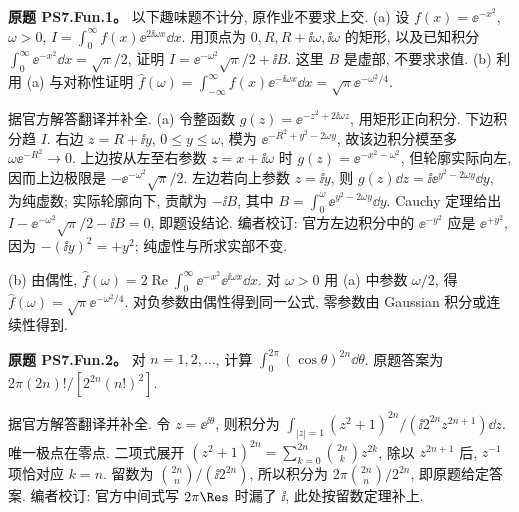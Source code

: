 \begin{exercise}
\textbf{原题 PS7.Fun.1。}\label{ass:ps7-fun1}
以下趣味题不计分, 原作业不要求上交.
(a) 设 $f(x)=\ee^{-x^2}$, $\omega>0$, $I=\int_0^\infty f(x)\ee^{2\ii\omega x}\dd x$. 用顶点为 $0,R,R+\ii\omega,\ii\omega$ 的矩形, 以及已知积分 $\int_0^\infty\ee^{-x^2}\dd x=\sqrt\pi/2$, 证明 $I=\ee^{-\omega^2}\sqrt\pi/2+\ii B$. 这里 $B$ 是虚部, 不要求求值.
(b) 利用 (a) 与对称性证明 $\widehat f(\omega)=\int_{-\infty}^{\infty}f(x)\ee^{-\ii\omega x}\dd x=\sqrt\pi\ee^{-\omega^2/4}$.
\end{exercise}
\begin{solution}
据官方解答翻译并补全.
(a) 令整函数 $g(z)=\ee^{-z^2+2\ii\omega z}$, 用矩形正向积分. 下边积分趋 $I$.
右边 $z=R+\ii y$, $0\le y\le\omega$, 模为 $\ee^{-R^2+y^2-2\omega y}$, 故该边积分模至多 $\omega\ee^{-R^2}\to0$.
上边按从左至右参数 $z=x+\ii\omega$ 时 $g(z)=\ee^{-x^2-\omega^2}$, 但轮廓实际向左, 因而上边极限是 $-\ee^{-\omega^2}\sqrt\pi/2$.
左边若向上参数 $z=\ii y$, 则 $g(z)\dd z=\ii\ee^{y^2-2\omega y}\dd y$, 为纯虚数; 实际轮廓向下, 贡献为 $-\ii B$, 其中 $B=\int_0^\omega\ee^{y^2-2\omega y}\dd y$.
Cauchy 定理给出 $I-\ee^{-\omega^2}\sqrt\pi/2-\ii B=0$, 即题设结论. 编者校订: 官方左边积分中的 $\ee^{-y^2}$ 应是 $\ee^{+y^2}$, 因为 $-(\ii y)^2=+y^2$; 纯虚性与所求实部不变.
\begin{center}
\end{center}
(b) 由偶性, $\widehat f(\omega)=2\operatorname{Re}\int_0^\infty\ee^{-x^2}\ee^{\ii\omega x}\dd x$. 对 $\omega>0$ 用 (a) 中参数 $\omega/2$, 得 $\widehat f(\omega)=\sqrt\pi\ee^{-\omega^2/4}$. 对负参数由偶性得到同一公式, 零参数由 Gaussian 积分或连续性得到.
\end{solution}

\begin{exercise}
\textbf{原题 PS7.Fun.2。}\label{ass:ps7-fun2}
对 $n=1,2,\ldots$, 计算 $\int_0^{2\pi}(\cos\theta)^{2n}\dd\theta$. 原题答案为 $2\pi(2n)!/[2^{2n}(n!)^2]$.
\end{exercise}
\begin{solution}
据官方解答翻译并补全. 令 $z=\ee^{\ii\theta}$, 则积分为
$\int_{|z|=1}(z^2+1)^{2n}/(\ii2^{2n}z^{2n+1})\dd z$.
唯一极点在零点. 二项式展开 $(z^2+1)^{2n}=\sum_{k=0}^{2n}\binom{2n}kz^{2k}$, 除以 $z^{2n+1}$ 后, $z^{-1}$ 项恰对应 $k=n$. 留数为 $\binom{2n}n/(\ii2^{2n})$, 所以积分为 $2\pi\binom{2n}n/2^{2n}$, 即原题给定答案. 编者校订: 官方中间式写 $2\pi\Res$ 时漏了 $\ii$, 此处按留数定理补上.
\end{solution}

